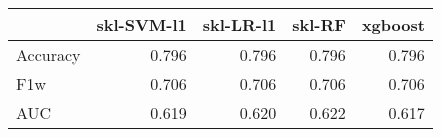 \begin{tabular}{lrrrr}
\toprule
{} &  skl-SVM-l1 &  skl-LR-l1 &  skl-RF &  xgboost \\
\midrule
Accuracy &       0.796 &      0.796 &   0.796 &    0.796 \\
F1w      &       0.706 &      0.706 &   0.706 &    0.706 \\
AUC      &       0.619 &      0.620 &   0.622 &    0.617 \\
\bottomrule
\end{tabular}
